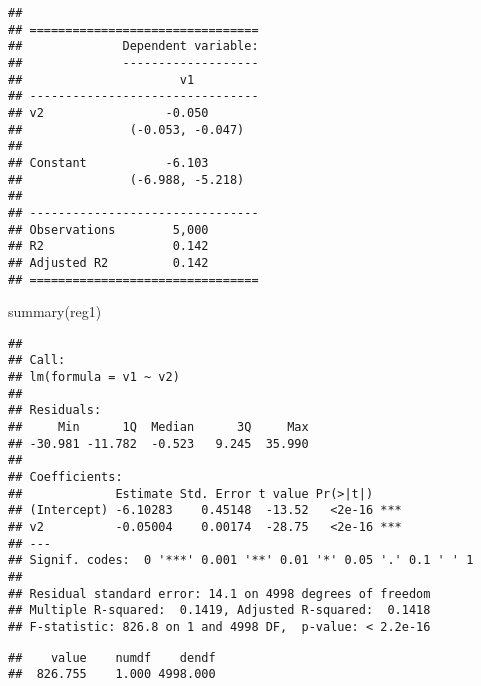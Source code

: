 \documentclass[
]{article}
\newenvironment{Shaded}{\begin{snugshade}}{\end{snugshade}}
\newcommand{\CommentTok}[1]{\textcolor[rgb]{0.56,0.35,0.01}{\textit{#1}}}
\newcommand{\FunctionTok}[1]{\textcolor[rgb]{0.00,0.00,0.00}{#1}}
\newcommand{\NormalTok}[1]{#1}
\newcommand{\OtherTok}[1]{\textcolor[rgb]{0.56,0.35,0.01}{#1}}
\newcommand{\SpecialCharTok}[1]{\textcolor[rgb]{0.00,0.00,0.00}{#1}}
\newcommand{\StringTok}[1]{\textcolor[rgb]{0.31,0.60,0.02}{#1}}
\begin{document}
\begin{verbatim}
## 
## ================================
##              Dependent variable:
##              -------------------
##                      v1         
## --------------------------------
## v2                 -0.050       
##               (-0.053, -0.047)  
##                                 
## Constant           -6.103       
##               (-6.988, -5.218)  
##                                 
## --------------------------------
## Observations        5,000       
## R2                  0.142       
## Adjusted R2         0.142       
## ================================
\end{verbatim}

\begin{Shaded}
\begin{Highlighting}[]
\FunctionTok{summary}\NormalTok{(reg1)}
\end{Highlighting}
\end{Shaded}

\begin{verbatim}
## 
## Call:
## lm(formula = v1 ~ v2)
## 
## Residuals:
##     Min      1Q  Median      3Q     Max 
## -30.981 -11.782  -0.523   9.245  35.990 
## 
## Coefficients:
##             Estimate Std. Error t value Pr(>|t|)    
## (Intercept) -6.10283    0.45148  -13.52   <2e-16 ***
## v2          -0.05004    0.00174  -28.75   <2e-16 ***
## ---
## Signif. codes:  0 '***' 0.001 '**' 0.01 '*' 0.05 '.' 0.1 ' ' 1
## 
## Residual standard error: 14.1 on 4998 degrees of freedom
## Multiple R-squared:  0.1419, Adjusted R-squared:  0.1418 
## F-statistic: 826.8 on 1 and 4998 DF,  p-value: < 2.2e-16
\end{verbatim}

\begin{Shaded}
\end{Shaded}

\begin{verbatim}
##    value    numdf    dendf 
##  826.755    1.000 4998.000
\end{verbatim}

\begin{Shaded}
\end{Shaded}
\end{document}
